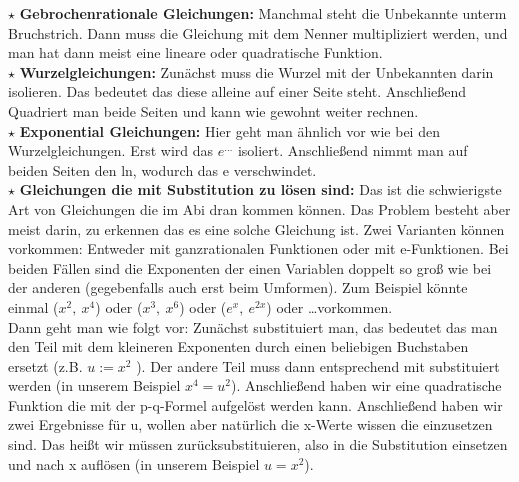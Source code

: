	\(\star\) \textbf{Gebrochenrationale Gleichungen: } Manchmal steht die
	Unbekannte unterm Bruchstrich. Dann muss die Gleichung mit dem Nenner
	multipliziert werden, und man hat dann meist eine lineare oder quadratische
	Funktion.\\
	
	\(\star\) \textbf{Wurzelgleichungen: } Zunächst muss die Wurzel mit der
	Unbekannten darin isolieren. Das bedeutet das diese alleine auf einer Seite
	steht. Anschließend Quadriert man beide Seiten und kann wie gewohnt weiter
	rechnen.\\
	
	\(\star\) \textbf{Exponential Gleichungen: } Hier geht man ähnlich vor wie bei
	den Wurzelgleichungen. Erst wird das \(e^{\ldots}\) isoliert. Anschließend
	nimmt man auf beiden Seiten den ln, wodurch das e verschwindet.\\
	
	\(\star\) \textbf{Gleichungen die mit Substitution zu lösen sind: } Das ist die
	schwierigste Art von Gleichungen die im Abi dran kommen können. Das Problem
	besteht aber meist darin, zu erkennen das es eine solche Gleichung ist. Zwei
	Varianten können vorkommen: Entweder mit ganzrationalen Funktionen oder mit
	e-Funktionen. Bei beiden Fällen sind die Exponenten der einen Variablen doppelt
	so groß wie bei der anderen (gegebenfalls auch erst beim Umformen). Zum
	Beispiel könnte einmal (\( x^2,\ x^4 \)) oder (\( x^3,\ x^6 \)) oder (\( e^x,\
	e^{2x} \)) oder \ldots vorkommen.\\
	Dann geht man wie folgt vor: Zunächst substituiert man, das bedeutet das man
	den Teil mit dem kleineren Exponenten durch einen beliebigen Buchstaben ersetzt
	(z.B. \( u:=x^2 \) ). Der andere Teil muss dann entsprechend mit substituiert
	werden (in unserem Beispiel \( x^4=u^2 \)). Anschließend haben wir eine
	quadratische Funktion die mit der p-q-Formel aufgelöst werden kann.
	Anschließend haben wir zwei Ergebnisse für u, wollen aber natürlich die x-Werte
	wissen die einzusetzen sind. Das heißt wir müssen zurücksubstituieren, also in
	die Substitution einsetzen und nach x auflösen (in unserem Beispiel \( u=x^2
	\)).